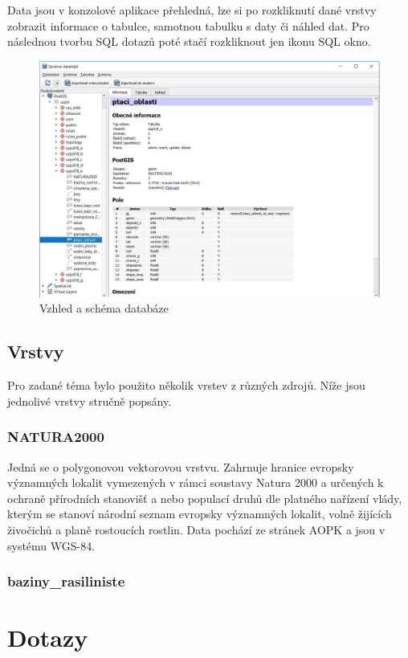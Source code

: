 \documentclass[a4paper, 12pt]{article}
\begin{document}
Data jsou v konzolové aplikace přehledná, lze si po rozkliknutí dané vrstvy zobrazit informace o tabulce, samotnou tabulku s daty či náhled dat. Pro následnou tvorbu SQL dotazů poté stačí rozkliknout jen ikonu SQL okno.

\begin{figure}[h!]
	\centering
	\includegraphics[width=15cm]{pictures/vzhled.jpg}
	\caption{Vzhled a schéma databáze}
\end{figure}

\subsection{Vrstvy}
Pro zadané téma bylo použito několik vrstev z různých zdrojů. Níže jsou jednolivé vrstvy stručně popsány.

\subsubsection{NATURA2000}
Jedná se o polygonovou vektorovou vrstvu. Zahrnuje hranice evropsky významných lokalit vymezených v rámci soustavy Natura 2000 a určených k ochraně přírodních stanovišť a nebo populací druhů dle platného nařízení vlády, kterým se stanoví národní seznam evropsky významných lokalit, volně žijících živočichů a planě rostoucích rostlin. Data pochází ze stránek AOPK a jsou v systému WGS-84.

\subsubsection{baziny\_rasiliniste}


\section{Dotazy}
\end{document}
